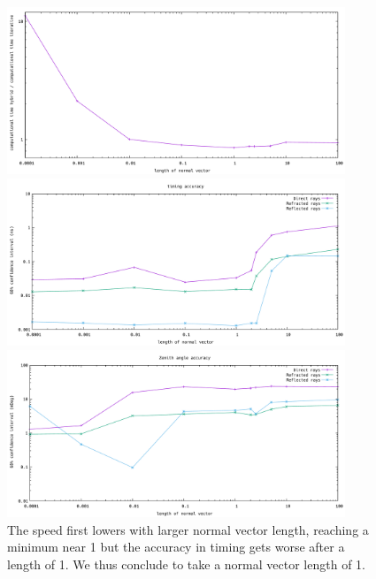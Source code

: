 \begin{figure}
	\centering
	\begin{minipage}{\textwidth}
		\includegraphics[width=0.9\textwidth]{figures/NormVsTime.pdf}
	\end{minipage}
	\begin{minipage}{\textwidth}
		\includegraphics[width=0.9\textwidth]{figures/NormVsSigmaTime.pdf}
	\end{minipage}
	\begin{minipage}{\textwidth}
		\includegraphics[width=0.9\textwidth]{figures/NormVsSigmaAZ.pdf}
	\end{minipage}
\caption{The speed first lowers with larger normal vector length, reaching a minimum near 1 but the accuracy in timing gets worse after a length of 1. We thus
conclude to take a normal vector length of 1.}
\label{fig:norminfl}
\end{figure}


